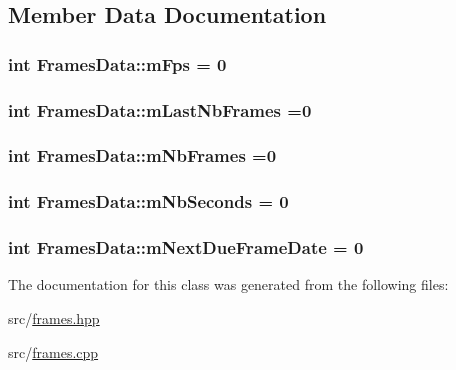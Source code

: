 \subsection{Member Data Documentation}
\hypertarget{class_frames_data_a6a6d7c603d09b1ba203e72a82d499eae}{
\subsubsection[{m\+Fps}]{\setlength{\rightskip}{0pt plus 5cm}int Frames\+Data\+::m\+Fps = 0\hspace{0.3cm}{\ttfamily [static]}}}\label{class_frames_data_a6a6d7c603d09b1ba203e72a82d499eae}
\hypertarget{class_frames_data_ad0b7497c5a449779d7dd01de39f592d0}{
\subsubsection[{m\+Last\+Nb\+Frames}]{\setlength{\rightskip}{0pt plus 5cm}int Frames\+Data\+::m\+Last\+Nb\+Frames =0\hspace{0.3cm}{\ttfamily [static]}}}\label{class_frames_data_ad0b7497c5a449779d7dd01de39f592d0}
\hypertarget{class_frames_data_a10cfddde5c0b9b229af867f2ed7af153}{
\subsubsection[{m\+Nb\+Frames}]{\setlength{\rightskip}{0pt plus 5cm}int Frames\+Data\+::m\+Nb\+Frames =0\hspace{0.3cm}{\ttfamily [static]}}}\label{class_frames_data_a10cfddde5c0b9b229af867f2ed7af153}
\hypertarget{class_frames_data_a56de1cc7ef9d170fe22887138d8addbf}{
\subsubsection[{m\+Nb\+Seconds}]{\setlength{\rightskip}{0pt plus 5cm}int Frames\+Data\+::m\+Nb\+Seconds = 0\hspace{0.3cm}{\ttfamily [static]}}}\label{class_frames_data_a56de1cc7ef9d170fe22887138d8addbf}
\hypertarget{class_frames_data_ac0c60108ce1672499d5d69d9c8ea9111}{
\subsubsection[{m\+Next\+Due\+Frame\+Date}]{\setlength{\rightskip}{0pt plus 5cm}int Frames\+Data\+::m\+Next\+Due\+Frame\+Date = 0\hspace{0.3cm}{\ttfamily [static]}}}\label{class_frames_data_ac0c60108ce1672499d5d69d9c8ea9111}


The documentation for this class was generated from the following files\+:\begin{DoxyCompactItemize}
\item 
src/\hyperlink{frames_8hpp}{frames.\+hpp}\item 
src/\hyperlink{frames_8cpp}{frames.\+cpp}\end{DoxyCompactItemize}
